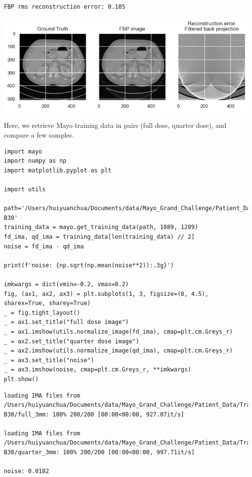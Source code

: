 \documentclass[a4paper, 11pt]{article}
\begin{document}
\begin{verbatim}
FBP rms reconstruction error: 0.105
\end{verbatim}

\begin{center}
\includegraphics[width=.9\linewidth]{./.ob-jupyter/aae84632d2a803a7aac0bf7c4eb669df0b4008ec.png}
\end{center}

Here, we retrieve Mayo training data in pairs (full dose, quarter dose), and compare a few samples.
\begin{verbatim}
import mayo
import numpy as np
import matplotlib.pyplot as plt

import utils

path='/Users/huiyuanchua/Documents/data/Mayo_Grand_Challenge/Patient_Data/Training_Image_Data/3mm B30'
training_data = mayo.get_training_data(path, 1089, 1289)
fd_ima, qd_ima = training_data[len(training_data) // 2]
noise = fd_ima - qd_ima

print(f'noise: {np.sqrt(np.mean(noise**2)):.3g}')

imkwargs = dict(vmin=-0.2, vmax=0.2)
fig, (ax1, ax2, ax3) = plt.subplots(1, 3, figsize=(8, 4.5), sharex=True, sharey=True)
_ = fig.tight_layout()
_ = ax1.set_title("full dose image")
_ = ax1.imshow(utils.normalize_image(fd_ima), cmap=plt.cm.Greys_r)
_ = ax2.set_title("quarter dose image")
_ = ax2.imshow(utils.normalize_image(qd_ima), cmap=plt.cm.Greys_r)
_ = ax3.set_title("noise")
_ = ax3.imshow(noise, cmap=plt.cm.Greys_r, **imkwargs)
plt.show()

\end{verbatim}

\begin{verbatim}
loading IMA files from /Users/huiyuanchua/Documents/data/Mayo_Grand_Challenge/Patient_Data/Training_Image_Data/3mm B30/full_3mm: 100% 200/200 [00:00<00:00, 927.07it/s]

loading IMA files from /Users/huiyuanchua/Documents/data/Mayo_Grand_Challenge/Patient_Data/Training_Image_Data/3mm B30/quarter_3mm: 100% 200/200 [00:00<00:00, 997.71it/s]

noise: 0.0182
\end{verbatim}
\end{document}
